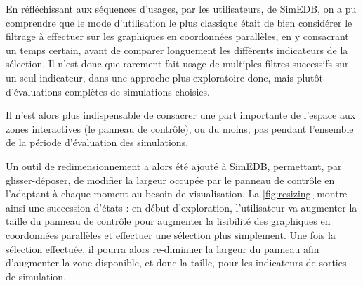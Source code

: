 			En réfléchissant aux séquences d'usages, par les utilisateurs, de SimEDB, on a pu comprendre que le mode d'utilisation le plus classique était de bien considérer le filtrage à effectuer sur les graphiques en coordonnées parallèles, en y consacrant un temps certain, avant de comparer longuement les différents indicateurs de la sélection.
			Il n'est donc que rarement fait usage de multiples filtres successifs sur un seul indicateur, dans une approche plus exploratoire donc, mais plutôt d'évaluations complètes de simulations choisies.
			
			Il n'est alors plus indispensable de consacrer une part importante de l'espace aux zones interactives (le panneau de contrôle), ou du moins, pas pendant l'ensemble de la période d'évaluation des simulations.
			
			Un outil de redimensionnement a alors été ajouté à SimEDB, permettant, par glisser-déposer, de modifier la largeur occupée par le panneau de contrôle en l'adaptant à chaque moment au besoin de visualisation.
			La \cref{fig:resizing} montre ainsi une succession d'états : en début d'exploration, l'utilisateur va augmenter la taille du panneau de contrôle pour augmenter la lisibilité des graphiques en coordonnées parallèles et effectuer une sélection plus simplement.
			Une fois la sélection effectuée, il pourra alors re-diminuer la largeur du panneau afin d'augmenter la zone disponible, et donc la taille, pour les indicateurs de sorties de simulation. 
		
